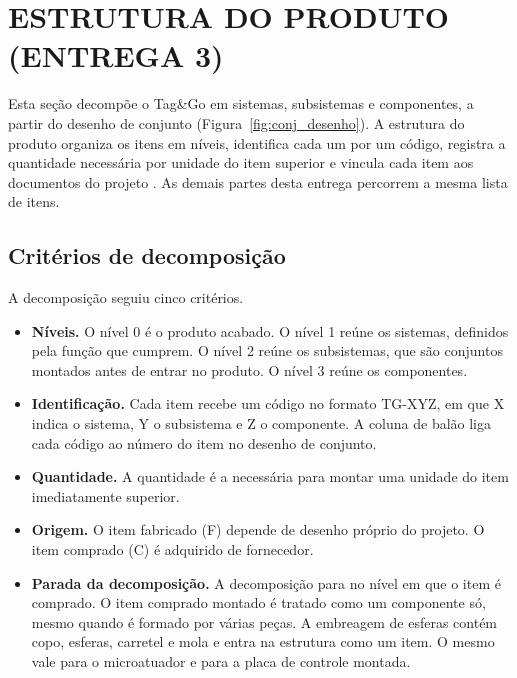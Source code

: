 \section{ESTRUTURA DO PRODUTO (ENTREGA 3)}\label{sec:estrutura_produto}


Esta seção decompõe o Tag\&Go em sistemas, subsistemas e componentes, a partir do desenho de conjunto (Figura~\ref{fig:conj_desenho}). A estrutura do produto organiza os itens em níveis, identifica cada um por um código, registra a quantidade necessária por unidade do item superior e vincula cada item aos documentos do projeto \cite{rozenfeld2006gestao}. As demais partes desta entrega percorrem a mesma lista de itens.

\subsection{Critérios de decomposição}
\label{subsec:estrut_criterios}

A decomposição seguiu cinco critérios.

\begin{itemize}
    \item \textbf{Níveis.} O nível 0 é o produto acabado. O nível 1 reúne os sistemas, definidos pela função que cumprem. O nível 2 reúne os subsistemas, que são conjuntos montados antes de entrar no produto. O nível 3 reúne os componentes.
    \item \textbf{Identificação.} Cada item recebe um código no formato TG-XYZ, em que X indica o sistema, Y o subsistema e Z o componente. A coluna de balão liga cada código ao número do item no desenho de conjunto.
    \item \textbf{Quantidade.} A quantidade é a necessária para montar uma unidade do item imediatamente superior.
    \item \textbf{Origem.} O item fabricado (F) depende de desenho próprio do projeto. O item comprado (C) é adquirido de fornecedor.
    \item \textbf{Parada da decomposição.} A decomposição para no nível em que o item é comprado. O item comprado montado é tratado como um componente só, mesmo quando é formado por várias peças. A embreagem de esferas contém copo, esferas, carretel e mola e entra na estrutura como um item. O mesmo vale para o microatuador e para a placa de controle montada.
\end{itemize}

